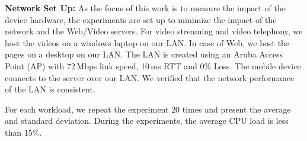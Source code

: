  





{\noindent \bf Network Set Up:}
As the focus of this work is to measure the impact of the device hardware, the 
experiments are set up to minimize the impact of the network and the Web/Video servers.
For video streaming and video telephony, we host the videos on a windows laptop on our LAN. 
In case of Web, we host the pages on a desktop on our LAN. The LAN is created using 
an Aruba Access Point (AP) with 72\,Mbps link speed, 10\,ms RTT and 0\% Loss. The mobile device connects to the server over our LAN. We verified that the network performance of the LAN is consistent.  

For each workload, we repeat the experiment 20 times and present the average and standard deviation. During the experiments, the average CPU load is less than 15\%. %

